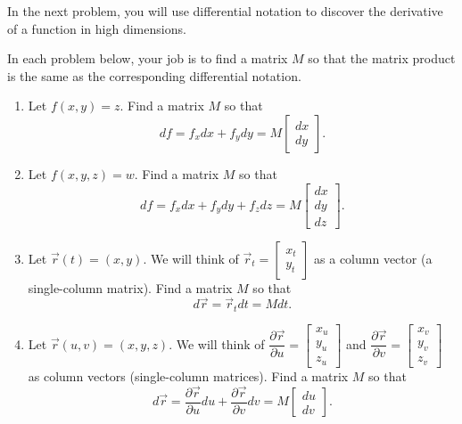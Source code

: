 In the next problem, you will use differential notation to discover the derivative of a function in high dimensions.
\begin{problem}\label{derive matrix derivative}%
In each problem below, your job is to find a matrix $M$ so that the matrix product is the same as the corresponding differential notation. 
\begin{enumerate}
 \item  Let $f(x,y)=z$. Find a matrix $M$ so that 
$$df=f_xdx+f_ydy=M\begin{bmatrix}dx\\dy\end{bmatrix}.$$
 \item  Let $f(x,y,z)=w$. Find a matrix $M$ so that 
$$df=f_xdx+f_ydy+f_zdz=M\begin{bmatrix}dx\\dy\\dz\end{bmatrix}.$$
 \item  Let $\vec r(t)=(x,y)$. We will think of $\vec r_t=\begin{bmatrix}x_t\\y_t\end{bmatrix}$ as a column vector (a single-column matrix).  Find a matrix $M$ so that 
$$d\vec r=\vec r_t dt=Mdt.$$
 \item  Let $\vec r(u,v)=(x,y,z)$. We will think of $\dfrac{\partial \vec r}{\partial u}=\begin{bmatrix}x_u\\y_u\\z_u\end{bmatrix}$ and $\dfrac{\partial \vec r}{\partial v}=\begin{bmatrix}x_v\\y_v\\z_v\end{bmatrix}$ as column vectors (single-column matrices).  Find a matrix $M$ so that 
$$d\vec r=\frac{\partial \vec r}{\partial u}du+\frac{\partial \vec r}{\partial v}dv=M\begin{bmatrix}du\\dv\end{bmatrix}.$$
\end{enumerate}
\end{problem}



